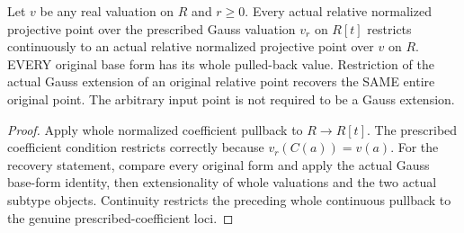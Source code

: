 \begin{definition}
\label{projective:actual-relative-polynomial-restriction}
\leanok
{}
Let $v$ be any real valuation on $R$ and $r\ge0$. Every actual relative
normalized projective point over the prescribed Gauss valuation $v_r$ on
$R[t]$ restricts continuously to an actual relative normalized projective
point over $v$ on $R$. EVERY original base form has its whole pulled-back
value. Restriction of the actual Gauss extension of an original relative
point recovers the SAME entire original point. The arbitrary input point
is not required to be a Gauss extension.
\end{definition}
\begin{proof}
Apply whole normalized coefficient pullback to $R\to R[t]$. The prescribed
coefficient condition restricts correctly because $v_r(C(a))=v(a)$.
For the recovery statement, compare every original form and apply the
actual Gauss base-form identity, then extensionality of whole valuations
and the two actual subtype objects. Continuity restricts the preceding
whole continuous pullback to the genuine prescribed-coefficient loci.
\end{proof}
